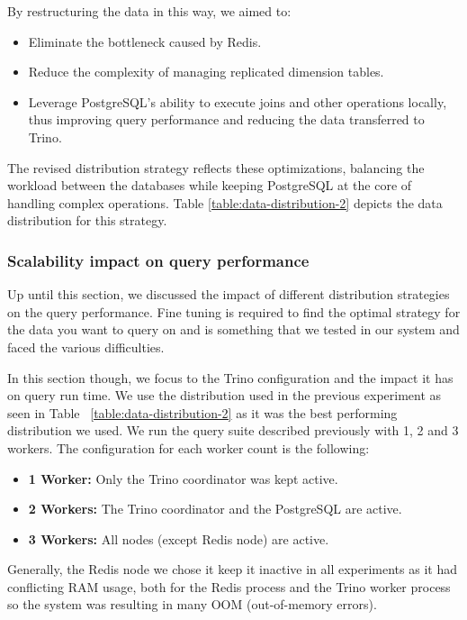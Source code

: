 \documentclass[conference]{IEEEtran}
\begin{document}
By restructuring the data in this way, we aimed to:
\begin{itemize}
	\item Eliminate the bottleneck caused by Redis.
	\item Reduce the complexity of managing replicated dimension tables.
	\item Leverage PostgreSQL’s ability to execute joins and other operations locally, thus improving query
	      performance and reducing the data transferred to Trino.
\end{itemize}

The revised distribution strategy reflects these optimizations, balancing the workload between the databases
while keeping PostgreSQL at the core of handling complex operations.
Table \ref{table:data-distribution-2} depicts the data distribution for this strategy.

\subsubsection{Scalability impact on query performance}

Up until this section, we discussed the impact of different distribution strategies on the query performance. Fine tuning is required to find the optimal strategy for the data you want to query on and is something that we tested in our system and faced the various difficulties.

In this section though, we focus to the Trino configuration and the impact it has on query run time. We use the distribution used in the previous experiment as seen in Table ~\ref{table:data-distribution-2} as it was the best performing distribution we used. We run the query suite described previously with 1, 2 and 3 workers. The configuration for each worker count is the following:

\begin{itemize}
	\item \textbf{1 Worker:} Only the Trino coordinator was kept active.
	\item \textbf{2 Workers:} The Trino coordinator and the PostgreSQL are active.
	\item \textbf{3 Workers:} All nodes (except Redis node) are active.
\end{itemize}

Generally, the Redis node we chose it keep it inactive in all experiments as it had conflicting RAM usage, both for the Redis process and the Trino worker process so the system was resulting in many OOM (out-of-memory errors).
\end{document}
